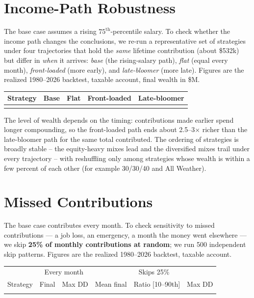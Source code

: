 \documentclass[11pt]{article}
\begin{document}
\section{Income-Path Robustness}\label{sec:incomepath}

The base case assumes a rising $75^{\text{th}}$-percentile salary. To check whether the income path
changes the conclusions, we re-run a representative set of strategies under four trajectories that hold
the \emph{same} lifetime contribution (about \$532k) but differ in \emph{when} it arrives: \emph{base}
(the rising-salary path), \emph{flat} (equal every month), \emph{front-loaded} (more early), and
\emph{late-bloomer} (more late). Figures are the realized 1980--2026 backtest, taxable account, final
wealth in \$M.

{\small
\begin{center}
\begin{tabular}{@{}lrrrr@{}}
\toprule
Strategy & Base & Flat & Front-loaded & Late-bloomer \\
\midrule
\\
\bottomrule
\end{tabular}
\end{center}
}

The level of wealth depends on the timing: contributions made earlier spend longer compounding, so the
front-loaded path ends about 2.5--3$\times$ richer than the late-bloomer path for the same total
contributed. The ordering of strategies is broadly stable -- the equity-heavy mixes lead and the
diversified mixes trail under every trajectory -- with reshuffling only among strategies whose wealth
is within a few percent of each other (for example 30/30/40 and All Weather).

\section{Missed Contributions}\label{sec:lazy}

The base case contributes every month. To check sensitivity to missed contributions --- a job loss, an
emergency, a month the money went elsewhere --- we skip \textbf{25\% of monthly contributions at
random}; we run 500 independent skip patterns. Figures are the realized 1980--2026 backtest, taxable
account.

{\small
\begin{center}
\begin{tabular}{@{}lrrrrr@{}}
\toprule
& \multicolumn{2}{c}{Every month} & \multicolumn{3}{c}{Skips 25\%} \\
Strategy & Final & Max DD & Mean final & Ratio [10--90th] & Max DD \\
\midrule
\\
\bottomrule
\end{tabular}
\end{center}
}
\end{document}
